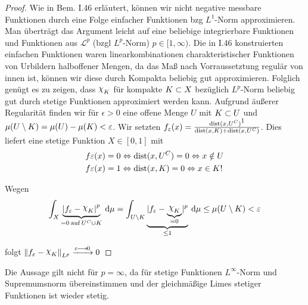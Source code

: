 \documentclass[skript.tex]{subfiles}
\begin{document}
\begin{proof}
	Wie in Bem. I.46 erläutert, können wir nicht negative messbare Funktionen durch eine Folge einfacher Funktionen bzg $L^1$-Norm approximieren. Man überträgt das Argument leicht auf eine beliebige integrierbare Funktionen und Funktionen aus $\mathscr{L}^p$ (bzgl $L^p$-Norm) $p \in [1,\infty)$. Die in I.46 konstruierten einfachen Funktionen waren linearkombinationen charakteristischer Funktionen von Urbildern halboffener Mengen, da das Maß nach Vorraussetztung regulär von innen ist, können wir diese durch Kompakta beliebig gut approximieren. Folglich genügt es zu zeigen, dass $\rchi_K$ für kompakte $K \subset X$ bezüglich $L^p$-Norm beliebig gut durch stetige Funktionen approximiert werden kann. Aufgrund äußerer Regularität finden wir für $\epsilon>0$ eine offene Menge $U$ mit $K \subset U$ und $\mu(U \setminus K) = \mu(U) - \mu(K) < \varepsilon$.
	Wir setzten $f_\epsilon(x) = \frac{\dist(x,U^C)\footnotemark}{\dist(x,K) + \dist(x,U^C)}$. Dies liefert eine stetige Funktion $ X \in [0,1]$ mit
	\begin{align*}
	f \varepsilon(x) &= 0 \Leftrightarrow \operatorname{dist}(x,U^C)=0 \Leftrightarrow x \notin U \\
	f \varepsilon(x) &= 1 \Leftrightarrow \operatorname{dist}(x,K)=0 \Leftrightarrow x \in K!
	\end{align*}

	Wegen
	\begin{equation*}
    \int_X \underbrace{\abs{f_\epsilon - \rchi_K}^p}_{=0 \: \text{auf} \: U^C \cup K} \md \mu = \int _{U \sm K} \underbrace{ \lvert f_\epsilon - \underbrace{\rchi_K}_{=0} \rvert^p}_{\leq 1} \md \mu \leq \mu(U \sm K) < \epsilon
	\end{equation*}
	
	folgt $\norm{f_\epsilon - \rchi_K}_{L^p} \xrightarrow{\epsilon\lra 0} 0$
\end{proof}

	Die Aussage gilt nicht für $p = \infty$, da für stetige Funktionen $L^{\infty}$-Norm und Supremumsnorm übereinstimmen und der gleichmäßige Limes stetiger Funktionen ist wieder stetig.
\end{document}
